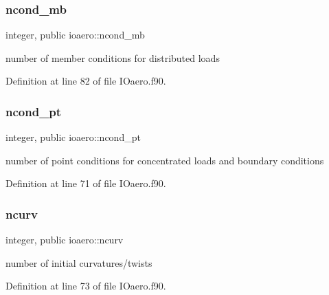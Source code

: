 \mbox{\label{namespaceioaero_ab9193f4ff70a22ae5858118fc653f22b}} 
\subsubsection{\texorpdfstring{ncond\+\_\+mb}{ncond\_mb}}
{\footnotesize\ttfamily integer, public ioaero\+::ncond\+\_\+mb}



number of member conditions for distributed loads 



Definition at line 82 of file I\+Oaero.\+f90.

\mbox{\label{namespaceioaero_a5ffc5d3578d9abad99d3736ba352e07d}} 
\subsubsection{\texorpdfstring{ncond\+\_\+pt}{ncond\_pt}}
{\footnotesize\ttfamily integer, public ioaero\+::ncond\+\_\+pt}



number of point conditions for concentrated loads and boundary conditions 



Definition at line 71 of file I\+Oaero.\+f90.

\mbox{\label{namespaceioaero_a34dabcb4bc1b4f260277297856ac3653}} 
\subsubsection{\texorpdfstring{ncurv}{ncurv}}
{\footnotesize\ttfamily integer, public ioaero\+::ncurv}



number of initial curvatures/twists 



Definition at line 73 of file I\+Oaero.\+f90.

\mbox{\label{namespaceioaero_a89e1f8f2d6913d23ef482a5788d2eba5}} 
